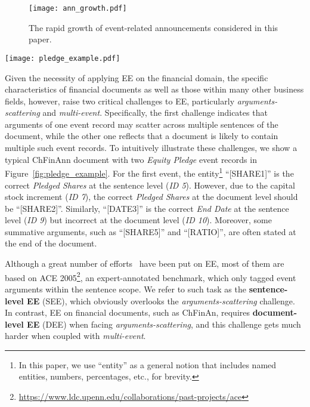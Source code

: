 \documentclass[11pt,a4paper]{article}
\begin{document}
\begin{figure}[tb]
\centering
\texttt{[image: ann\_growth.pdf]}
\caption{The rapid growth of event-related announcements considered in this paper.}
\label{fig:ann_growth}
\end{figure}

\begin{figure*}[tb]
\centering
\texttt{[image: pledge\_example.pdf]}
\caption{A document example with two \textit{Equity Pledge} event records whose arguments scatter across multiple sentences, where we use \textit{ID} to denote the sentence index, substitute entity mentions with corresponding marks, and color event arguments outside the scope of key-event sentences as red.}
\label{fig:pledge_example}
\end{figure*}

Given the necessity of applying EE on the financial domain, the specific characteristics of financial documents as well as those within many other business fields, however, raise two critical challenges to EE, particularly \textit{arguments-scattering} and \textit{multi-event}.  Specifically, the first challenge indicates that arguments of one event record may scatter across multiple sentences of the document, while the other one reflects that a document is likely to contain multiple such event records.
To intuitively illustrate these challenges,
we show a typical ChFinAnn document with two \textit{Equity Pledge} event records in Figure~\ref{fig:pledge_example}.
For the first event, the entity\footnote{In this paper, we use ``entity'' as a general notion that includes named entities, numbers, percentages, etc., for brevity.} ``[SHARE1]'' is the correct \textit{Pledged Shares} at the sentence level (\textit{ID 5}).
However, due to the capital stock increment (\textit{ID 7}), the correct \textit{Pledged Shares} at the document level should be ``[SHARE2]''.
Similarly, ``[DATE3]'' is the correct \textit{End Date} at the sentence level (\textit{ID 9}) but incorrect at the document level (\textit{ID 10}).
Moreover, some summative arguments, such as ``[SHARE5]'' and ``[RATIO]'', are often stated at the end of the document.

Although a great number of efforts~\cite{ahn2006stages,ji2008refining,liao2010using,hong2011using,riedel2011fast,li2013joint,li2014constructing,chen2015event,yang2016joint,nguyen2016joint,liu2017exploiting,sha2018jointly,zhang2018event,nguyen2019one,wang2019adversarial} have been put on EE, most of them are based on ACE 2005\footnote{\url{https://www.ldc.upenn.edu/collaborations/past-projects/ace}},
an expert-annotated benchmark, 
which only tagged event arguments within the sentence scope.
We refer to such task as the \textbf{sentence-level EE} (SEE), which obviously overlooks the \textit{arguments-scattering} challenge.
In contrast, EE on financial documents, such as ChFinAn, requires \textbf{document-level EE} (DEE) when facing \textit{arguments-scattering}, and this challenge gets much harder when coupled with \textit{multi-event}. 
\end{document}
